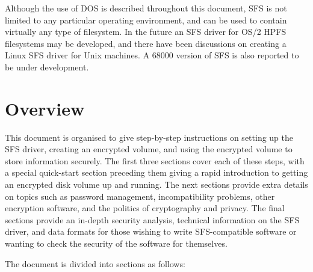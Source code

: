 Although the use of DOS is described throughout this document, SFS is not
limited to any particular operating environment, and can be used to contain
virtually any type of filesystem.  In the future an SFS driver for OS/2 HPFS
filesystems may be developed, and there have been discussions on creating a
Linux SFS driver for Unix machines.  A 68000 version of SFS is also reported to
be under development.


\section{Overview}

This document is organised to give step-by-step instructions on setting up the
SFS driver, creating an encrypted volume, and using the encrypted volume to
store information securely.  The first three sections cover each of these
steps, with a special quick-start section preceding them giving a rapid
introduction to getting an encrypted disk volume up and running.  The next
sections provide extra details on topics such as password management,
incompatibility problems, other encryption software, and the politics of
cryptography and privacy.  The final sections provide an in-depth security
analysis, technical information on the SFS driver, and data formats for those
wishing to write SFS-compatible software or wanting to check the security of
the software for themselves.

The document is divided into sections as follows:

